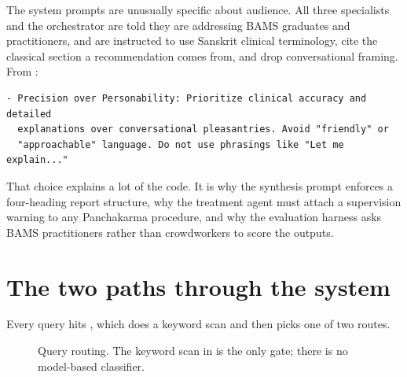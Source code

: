 The system prompts are unusually specific about audience. All three specialists and the orchestrator are told they are addressing BAMS graduates and practitioners, and are instructed to use Sanskrit clinical terminology, cite the classical section a recommendation comes from, and drop conversational framing. From :

\begin{lstlisting}[style=plain]
- Precision over Personability: Prioritize clinical accuracy and detailed
  explanations over conversational pleasantries. Avoid "friendly" or
  "approachable" language. Do not use phrasings like "Let me explain..."
\end{lstlisting}

That choice explains a lot of the code. It is why the synthesis prompt enforces a four-heading report structure, why the treatment agent must attach a supervision warning to any Panchakarma procedure, and why the evaluation harness asks BAMS practitioners rather than crowdworkers to score the outputs.

\section{The two paths through the system}

Every query hits , which does a keyword scan and then picks one of two routes.

\begin{figure}[H]
\centering
{}
\caption{Query routing. The keyword scan in  is the only gate; there is no model-based classifier.}
\end{figure}

